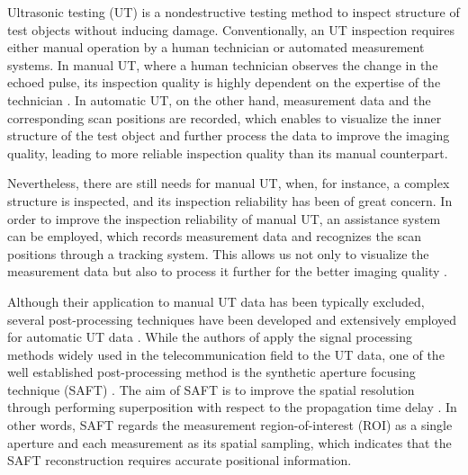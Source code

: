
Ultrasonic testing (UT) is a nondestructive testing method to inspect structure of test objects without inducing damage. Conventionally, an UT inspection requires either manual operation by a human technician or automated measurement systems. In manual UT, where a human technician observes the change in the echoed pulse, its inspection quality is highly dependent on the expertise of the technician \cite{Cawley01IMechE}. In automatic UT, on the other hand, measurement data and the corresponding scan positions are recorded, which enables to visualize the inner structure of the test object and further process the data to improve the imaging quality, leading to more reliable inspection quality than its manual counterpart. \par

Nevertheless, there are still needs for manual UT, when, for instance, a complex structure is inspected, and its inspection reliability has been of great concern. In order to improve the inspection reliability of manual UT, an assistance system can be employed, which records measurement data and recognizes the scan positions through a tracking system. This allows us not only to visualize the measurement data but also to process it further for the better imaging quality \cite{Krieg18SHMNDT}. \par

Although their application to manual UT data has been typically excluded, several post-processing techniques have been developed and extensively employed for automatic UT data \cite{Hall88} \cite{Krautkraemer90} \cite{Ericsson98ECNDDT}. While the authors of \cite{Ericsson98ECNDDT} apply the signal processing methods widely used in the telecommunication field to the UT data, one of the well established post-processing method is the synthetic aperture focusing technique (SAFT) \cite{Hall88} \cite{Krautkraemer90}. The aim of SAFT is to improve the spatial resolution through performing superposition with respect to the propagation time delay \cite{Lingvall04PhD}. In other words, SAFT regards the measurement region-of-interest (ROI) as a single aperture and each measurement as its spatial sampling, which indicates that the SAFT reconstruction requires accurate positional information. \par

